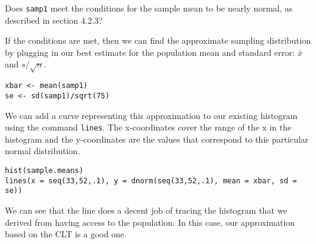 \documentclass[11pt]{article}
\begin{document}
\begin{exercise}
Does \texttt{samp1} meet the conditions for the sample mean to be nearly normal, as described in section 4.2.3?
\end{exercise}

If the conditions are met, then we can find the approximate sampling distribution by plugging in our best estimate for the population mean and standard error: $\bar{x}$ and $s/\sqrt{n}$.  

\begin{lstlisting}
xbar <- mean(samp1)
se <- sd(samp1)/sqrt(75)
\end{lstlisting}

We can add a curve representing this approximation to our existing histogram using the command \texttt{lines}.  The x-coordinates cover the range of the x in the histogram and the y-coordinates are the values that correspond to this particular normal distribution.

\begin{lstlisting}
hist(sample.means)
lines(x = seq(33,52,.1), y = dnorm(seq(33,52,.1), mean = xbar, sd = se))
\end{lstlisting}

We can see that the line does a decent job of tracing the histogram that we derived from having access to the population.  In this case, our approximation based on the CLT is a good one.

\end{document}
